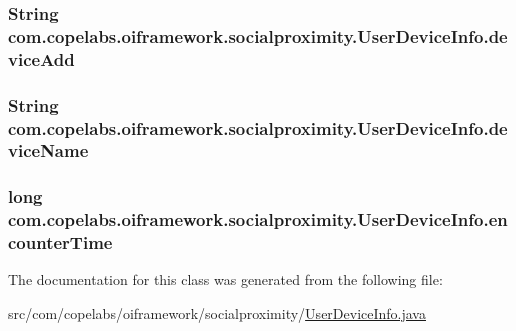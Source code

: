 \subsubsection[{device\+Add}]{\setlength{\rightskip}{0pt plus 5cm}String com.\+copelabs.\+oiframework.\+socialproximity.\+User\+Device\+Info.\+device\+Add\hspace{0.3cm}{\ttfamily [private]}}\label{classcom_1_1copelabs_1_1oiframework_1_1socialproximity_1_1_user_device_info_a982ea56c8215d617be03abc51b947f97}
\hypertarget{classcom_1_1copelabs_1_1oiframework_1_1socialproximity_1_1_user_device_info_aba7f9036ed638f139476b79f09387f2d}{}
\subsubsection[{device\+Name}]{\setlength{\rightskip}{0pt plus 5cm}String com.\+copelabs.\+oiframework.\+socialproximity.\+User\+Device\+Info.\+device\+Name\hspace{0.3cm}{\ttfamily [private]}}\label{classcom_1_1copelabs_1_1oiframework_1_1socialproximity_1_1_user_device_info_aba7f9036ed638f139476b79f09387f2d}
\hypertarget{classcom_1_1copelabs_1_1oiframework_1_1socialproximity_1_1_user_device_info_ab80fa8c65b6e2fec9aba0cc25781a881}{}
\subsubsection[{encounter\+Time}]{\setlength{\rightskip}{0pt plus 5cm}long com.\+copelabs.\+oiframework.\+socialproximity.\+User\+Device\+Info.\+encounter\+Time\hspace{0.3cm}{\ttfamily [private]}}\label{classcom_1_1copelabs_1_1oiframework_1_1socialproximity_1_1_user_device_info_ab80fa8c65b6e2fec9aba0cc25781a881}


The documentation for this class was generated from the following file\+:\begin{DoxyCompactItemize}
\item 
src/com/copelabs/oiframework/socialproximity/\hyperlink{_user_device_info_8java}{User\+Device\+Info.\+java}\end{DoxyCompactItemize}
